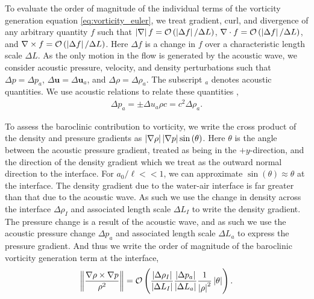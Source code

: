 To evaluate the order of magnitude of the individual terms of the
vorticity generation equation \eqref{eq:vorticity_euler}, we treat
gradient, curl, and divergence of any arbitrary quantity $f$ such that
$\left|\nabla\right| f= \mathcal{O}\left(\left|\Delta f\right|/\Delta L\right)$,
$\nabla\cdot f=\mathcal{O}\left(\left|\Delta f\right|/\Delta L\right)$, and
$\nabla\times f=\mathcal{O}\left(\left|\Delta f\right|/\Delta L\right)$. Here
$\Delta f$ is a change in $f$ over a characteristic length scale
$\Delta L$. As the only motion in the flow is generated by the
acoustic wave, we consider acoustic pressure, velocity, and density
perturbations such that $\Delta p=\Delta p_a$,
$\Delta \boldsymbol{u}=\Delta \boldsymbol{u}_a$, and
$\Delta \rho=\Delta \rho_a$. The subscript $_a$ denotes acoustic
quantities. We use acoustic relations to relate these quantities
\citep{Anderson1990},
\begin{align}%
  \label{eq:acoustic_relations}%
  \Delta p_a=\pm\Delta u_a \rho c=c^2\Delta \rho_a.%
\end{align}

To assess the baroclinic contribution to vorticity, we write the cross
product of the density and pressure gradients as
$\left|\nabla \rho\right| \left|\nabla p\right| \sin{\left(\theta\right)}$. Here
$\theta$ is the angle between the acoustic pressure gradient, treated
as being in the $\plus y$-direction, and the direction of the density
gradient which we treat as the outward normal direction to the
interface. For $a_0/\ell<<1$, we can approximate
$\sin{\left(\theta\right)}\approx\theta$ at the interface. The density
gradient due to the water-air interface is far greater than that due
to the acoustic wave. As such we use the change in density across the
interface $\Delta \rho_I$ and associated length scale $\Delta L_I$ to
write the density gradient. The pressure change is a result of the
acoustic wave, and as such we use the acoustic pressure change
$\Delta p_a$ and associated length scale $\Delta L_a$ to express the
pressure gradient. And thus we write the order of magnitude of the
baroclinic vorticity generation term at the interface,
\begin{align}
  \label{eq:baroclinic_vorticity}%
  \norm{\frac{\nabla\rho\times\nabla p}{\rho^2}} =%
  \orderof{\frac{\abs{\Delta \rho_I}}{\abs{\Delta L_I}}\frac{\abs{\Delta p_a}}{\abs{\Delta L_a}}\frac{1}{\abs{\rho}^2}\abs{\theta}}.%
\end{align}

